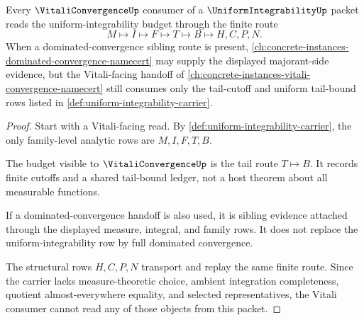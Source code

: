 \begin{theorem}
\label{thm:uniform-integrability-vitali-consumption}
Every $\VitaliConvergenceUp$ consumer of a $\UniformIntegrabilityUp$ packet reads the uniform-integrability budget through the finite route
$$
M \longmapsto I \longmapsto F \longmapsto T \longmapsto B \longmapsto H,C,P,N .
$$
When a dominated-convergence sibling route is present, \autoref{ch:concrete-instances-dominated-convergence-namecert} may supply the displayed majorant-side evidence, but the Vitali-facing handoff of \autoref{ch:concrete-instances-vitali-convergence-namecert} still consumes only the tail-cutoff and uniform tail-bound rows listed in \autoref{def:uniform-integrability-carrier}.
\end{theorem}
\begin{proof}
Start with a Vitali-facing read. By \autoref{def:uniform-integrability-carrier}, the only family-level analytic rows are $M,I,F,T,B$.

The budget visible to $\VitaliConvergenceUp$ is the tail route $T \longmapsto B$. It records finite cutoffs and a shared tail-bound ledger, not a host theorem about all measurable functions.

If a dominated-convergence handoff is also used, it is sibling evidence attached through the displayed measure, integral, and family rows. It does not replace the uniform-integrability row by full dominated convergence.

The structural rows $H,C,P,N$ transport and replay the same finite route. Since the carrier lacks measure-theoretic choice, ambient integration completeness, quotient almost-everywhere equality, and selected representatives, the Vitali consumer cannot read any of those objects from this packet.
\end{proof}



